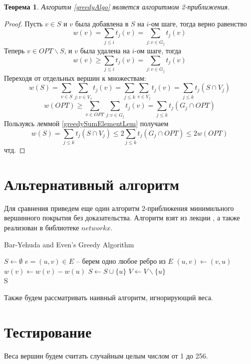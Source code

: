 \documentclass{article}
\newtheorem{theorem}{Теорема}
\theoremstyle{definition}
\begin{document}
  \begin{theorem}
    Алгоритм \ref{greedyAlgo} является алгоритмом 2-приближения.
  \end{theorem}
  \begin{proof}
    Пусть $v \in S$ и $v$ была добавлена в $S$ на $i$-ом шаге, тогда верно равенство
    $$w(v) = \sum_{j \le i}t_j(v) = \sum_{j:v \in G_j}t_j(v)$$
    Теперь $v \in OPT \backslash S$, и $v$ была удалена на $i$-ом шаге, тогда
    $$w(v) \ge \sum_{j \le i}t_j(v) = \sum_{j:v \in G_j}t_j(v)$$
    Переходя от отдельных вершин к множествам:
    $$w(S) = \sum_{v\in S}\sum_{j: v \in V_j}t_j(v) = \sum_{j \le k}\sum_{v \in V_j}t_j(v) = \sum_{j\le k}t_j(S \cap V_j)$$
    $$w(OPT) \ge \sum_{v \in OPT}\sum_{j:v\in G_j}t_j(v) = \sum_{j\le k}t_j(G_j \cap OPT)$$
    Пользуясь леммой \ref{greedySumElementLem} получаем
    $$w(S) = \sum_{j\le k}t_j(S \cap V_j) \le 2\sum_{j\le k}t_j(G_j \cap OPT) \le 2w(OPT)$$
    чтд.
  \end{proof}
  \section{Альтернативный алгоритм}
  Для сравнения приведем еще один алгоритм $2$-приближения минимильного вершинного покрытия без доказательства.
  Алгоритм взят из лекции \cite{bye_algo_ref}, а также реализован в библиотеке $networkx$.
  \begin{algorithm}[H]
    \caption{Bar-Yehuda and Even's Greedy Algorithm}\label{bye_algo}
    \begin{algorithmic}
      \State $S \gets \emptyset$
        \State $e = (u, v) \in E$ -- берем одно любое ребро из $E$
          \State $(u, v) \gets (v, u)$
        \EndIf
        \State $w(v) \gets w(v) - w(u)$
        \State $S \gets S \cup \{u\}$
        \State $V \gets V \backslash \{u\}$
      \EndWhile \\
      \Return S
    \end{algorithmic}
  \end{algorithm}
  Также будем рассматривать наивный алгоритм, игнорирующий веса.
  \section{Тестирование}
  Веса вершин будем считать случайным целым числом от 1 до 256.
\end{document}
